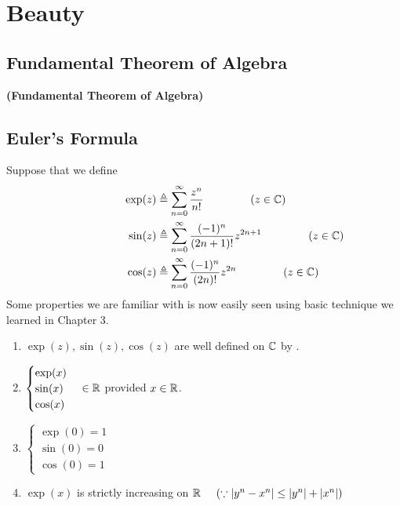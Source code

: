 \documentclass{report}
\begin{document}
\chapter{Beauty}
\section{Fundamental Theorem of Algebra}
\begin{theorem}
\textbf{(Fundamental Theorem of Algebra)}
\end{theorem}
\section{Euler's Formula}
\begin{mdframed}
Suppose that we define 
\begin{align*}
  \hspace{2cm}\exp(z)&\triangleq \sum_{n=0}^\infty \frac{z^n}{n!}\hspace{1.5cm}(z\in\mathbb{C})\\
  \hspace{2cm}\sin (z)&\triangleq \sum_{n=0}^\infty \frac{(-1)^n}{(2n+1)!}z^{2n+1}\hspace{1.5cm}(z\in\mathbb{C})\\
  \hspace{2cm}\cos (z)&\triangleq \sum_{n=0}^\infty \frac{(-1)^n}{(2n)!}z^{2n}\hspace{1.5cm}(z\in\mathbb{C})
\end{align*}
Some properties we are familiar with is now easily seen using basic technique we learned in Chapter 3. 
\begin{enumerate}[label=(\alph*)]
  \item $\exp(z),\sin(z),\cos(z)$ are well defined on $\mathbb{C}$ by .  
  \item $\begin{cases}
    \exp(x)\\
    \sin(x)\\
    \cos(x)
  \end{cases}\in\mathbb{R}$ provided $x\in\mathbb{R}$. 
  \item $\begin{cases}
    \exp(0)=1 \\
    \sin(0)=0\\
    \cos (0)=1
  \end{cases}$
  \item $\exp(x)$ is strictly increasing on $\mathbb{R}\hspace{0.5cm}(\because \left|y^n-x^n\right|\leq \left|y^n\right|+\left|x^n\right|)$

\end{enumerate}
\end{mdframed}
\end{document}
